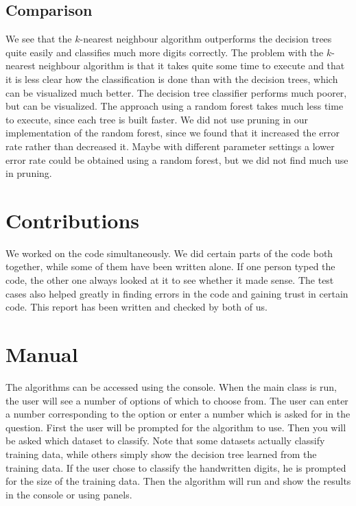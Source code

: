 \documentclass[10pt,a4paper]{article}
\begin{document}
\subsection{Comparison}
We see that the $k$-nearest neighbour algorithm outperforms the decision trees quite easily and classifies much more digits correctly. The problem with the $k$-nearest neighbour algorithm is that it takes quite some time to execute and that it is less clear how the classification is done than with the decision trees, which can be visualized much better. The decision tree classifier performs much poorer, but can be visualized. The approach using a random forest takes much less time to execute, since each tree is built faster. We did not use pruning in our implementation of the random forest, since we found that it increased the error rate rather than decreased it. Maybe with different parameter settings a lower error rate could be obtained using a random forest, but we did not find much use in pruning.

\section{Contributions}
We worked on the code simultaneously. We did certain parts of the code both together, while some of them have been written alone. If one person typed the code, the other one always looked at it to see whether it made sense. The test cases also helped greatly in finding errors in the code and gaining trust in certain code. This report has been written and checked by both of us.

\section{Manual}
The algorithms can be accessed using the console. When the main class is run, the user will see a number of options of which to choose from. The user can enter a number corresponding to the option or enter a number which is asked for in the question. First the user will be prompted for the algorithm to use. Then you will be asked which dataset to classify. Note that some datasets actually classify training data, while others simply show the decision tree learned from the training data. If the user chose to classify the handwritten digits, he is prompted for the size of the training data. Then the algorithm will run and show the results in the console or using panels.
\end{document}
